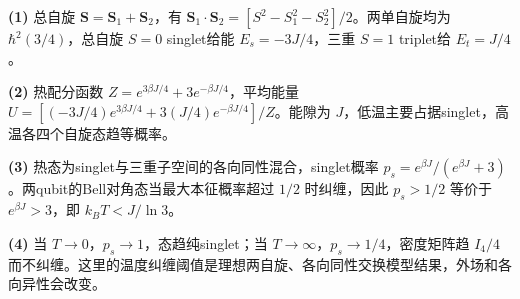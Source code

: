\par\noindent\textbf{(1)} 总自旋 \(\boldsymbol S=\boldsymbol S_1+\boldsymbol S_2\)，有 \(\boldsymbol S_1\cdot\boldsymbol S_2=[S^2-S_1^2-S_2^2]/2\)。两单自旋均为 \(\hbar^2(3/4)\)，总自旋 \(S=0\) singlet给能 \(E_s=-3J/4\)，三重 \(S=1\) triplet给 \(E_t=J/4\)。
\par\noindent\textbf{(2)} 热配分函数 \(Z=e^{3\beta J/4}+3e^{-\beta J/4}\)，平均能量 \(U=[(-3J/4)e^{3\beta J/4}+3(J/4)e^{-\beta J/4}]/Z\)。能隙为 \(J\)，低温主要占据singlet，高温各四个自旋态趋等概率。
\par\noindent\textbf{(3)} 热态为singlet与三重子空间的各向同性混合，singlet概率 \(p_s=e^{\beta J}/(e^{\beta J}+3)\)。两qubit的Bell对角态当最大本征概率超过 \(1/2\) 时纠缠，因此 \(p_s>1/2\) 等价于 \(e^{\beta J}>3\)，即 \(k_BT<J/\ln3\)。
\par\noindent\textbf{(4)} 当 \(T\to0\)，\(p_s\to1\)，态趋纯singlet；当 \(T\to\infty\)，\(p_s\to1/4\)，密度矩阵趋 \(I_4/4\) 而不纠缠。这里的温度纠缠阈值是理想两自旋、各向同性交换模型结果，外场和各向异性会改变。

